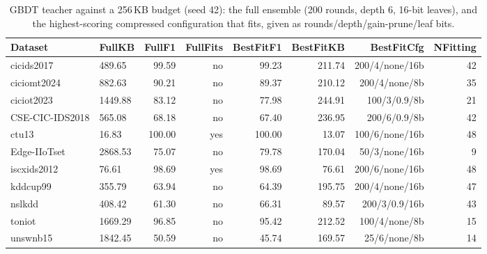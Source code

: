 \begin{table}[t]\centering\small
\caption{GBDT teacher against a 256\,KB budget (seed 42): the full ensemble (200 rounds, depth 6, 16-bit leaves), and the highest-scoring compressed configuration that fits, given as rounds/depth/gain-prune/leaf bits.}
\label{tab:dep:envelope}
\begin{tabular}{llrrrrrr}
\toprule
Dataset & FullKB & FullF1 & FullFits & BestFitF1 & BestFitKB & BestFitCfg & NFitting \\
\midrule
cicids2017 & 489.65 & 99.59 & no & 99.23 & 211.74 & 200/4/none/16b & 42 \\
ciciomt2024 & 882.63 & 90.21 & no & 89.37 & 210.12 & 200/4/none/8b & 35 \\
ciciot2023 & 1449.88 & 83.12 & no & 77.98 & 244.91 & 100/3/0.9/8b & 21 \\
CSE-CIC-IDS2018 & 565.08 & 68.18 & no & 67.40 & 236.95 & 200/6/0.9/8b & 42 \\
ctu13 & 16.83 & 100.00 & yes & 100.00 & 13.07 & 100/6/none/16b & 48 \\
Edge-IIoTset & 2868.53 & 75.07 & no & 79.78 & 170.04 & 50/3/none/16b & 9 \\
iscxids2012 & 76.61 & 98.69 & yes & 98.69 & 76.61 & 200/6/none/16b & 48 \\
kddcup99 & 355.79 & 63.94 & no & 64.39 & 195.75 & 200/4/none/16b & 47 \\
nslkdd & 408.42 & 61.30 & no & 66.31 & 89.57 & 200/3/0.9/16b & 43 \\
toniot & 1669.29 & 96.85 & no & 95.42 & 212.52 & 100/4/none/8b & 15 \\
unswnb15 & 1842.45 & 50.59 & no & 45.74 & 169.57 & 25/6/none/8b & 14 \\
\bottomrule
\end{tabular}
\end{table}
